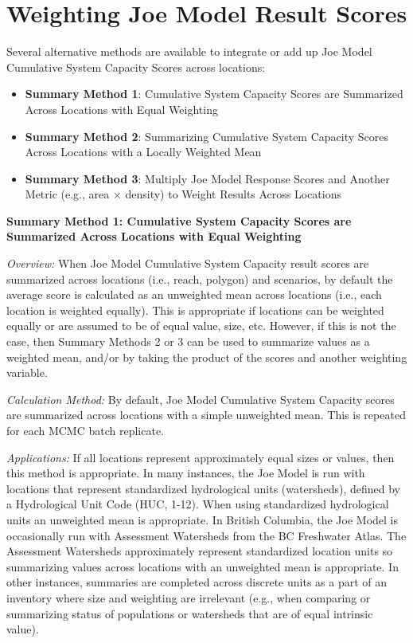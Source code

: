 \documentclass[
  letterpaper,
  DIV=11,
  numbers=noendperiod]{scrreprt}
\providecommand{\tightlist}{%
  \setlength{\itemsep}{0pt}\setlength{\parskip}{0pt}}
\begin{document}
\section{Weighting Joe Model Result
Scores}\label{weighting-joe-model-result-scores}

Several alternative methods are available to integrate or add up Joe
Model Cumulative System Capacity Scores across locations:

\begin{itemize}
\tightlist
\item
  \textbf{Summary Method 1}: Cumulative System Capacity Scores are
  Summarized Across Locations with Equal Weighting
\item
  \textbf{Summary Method 2}: Summarizing Cumulative System Capacity
  Scores Across Locations with a Locally Weighted Mean
\item
  \textbf{Summary Method 3}: Multiply Joe Model Response Scores and
  Another Metric (e.g., area × density) to Weight Results Across
  Locations
\end{itemize}

\textbf{Summary Method 1: Cumulative System Capacity Scores are
Summarized Across Locations with Equal Weighting}

\emph{Overview:} When Joe Model Cumulative System Capacity result scores
are summarized across locations (i.e., reach, polygon) and scenarios, by
default the average score is calculated as an unweighted mean across
locations (i.e., each location is weighted equally). This is appropriate
if locations can be weighted equally or are assumed to be of equal
value, size, etc. However, if this is not the case, then Summary Methods
2 or 3 can be used to summarize values as a weighted mean, and/or by
taking the product of the scores and another weighting variable.

\emph{Calculation Method:} By default, Joe Model Cumulative System
Capacity scores are summarized across locations with a simple unweighted
mean. This is repeated for each MCMC batch replicate.

\emph{Applications:} If all locations represent approximately equal
sizes or values, then this method is appropriate. In many instances, the
Joe Model is run with locations that represent standardized hydrological
units (watersheds), defined by a Hydrological Unit Code (HUC, 1-12).
When using standardized hydrological units an unweighted mean is
appropriate. In British Columbia, the Joe Model is occasionally run with
Assessment Watersheds from the BC Freshwater Atlas. The Assessment
Watersheds approximately represent standardized location units so
summarizing values across locations with an unweighted mean is
appropriate. In other instances, summaries are completed across discrete
units as a part of an inventory where size and weighting are irrelevant
(e.g., when comparing or summarizing status of populations or watersheds
that are of equal intrinsic value).
\end{document}
